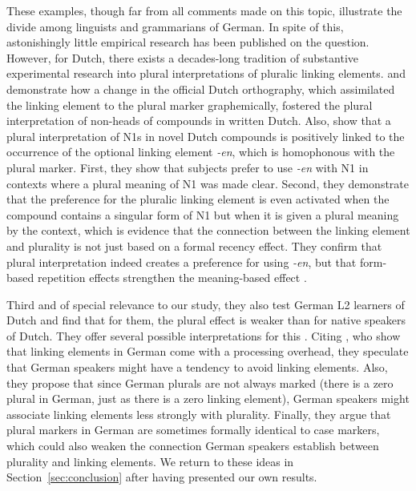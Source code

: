 These examples, though far from all comments made on this topic, illustrate the divide among linguists and grammarians of German.
In spite of this, astonishingly little empirical research has been published on the question.
However, for Dutch, there exists a decades-long tradition of substantive experimental research into plural interpretations of pluralic linking elements.
\citet{SchreuderEa1998} and \citet{BangaEa2012} demonstrate how a change in the official Dutch orthography, which assimilated the linking element to the plural marker graphemically, fostered the plural interpretation of non-heads of compounds in written Dutch.
Also, \citet{BangaEa2013a} show that a plural interpretation of N1s in novel Dutch compounds is positively linked to the occurrence of the optional linking element \mbox{\textit{-en}}, which is homophonous with the plural marker.
First, they show that subjects prefer to use \textit{-en} with N1 in contexts where a plural meaning of N1 was made clear.
Second, they demonstrate that the preference for the pluralic linking element is even activated when the compound contains a singular form of N1 but when it is given a plural meaning by the context, which is evidence that the connection between the linking element and plurality is not just based on a formal recency effect.
They confirm that plural interpretation indeed creates a preference for using \textit{-en}, but that form-based repetition effects strengthen the meaning-based effect \citep[45]{BangaEa2013a}.

Third and of special relevance to our study, they also test German L2 learners of Dutch and find that for them, the plural effect is weaker than for native speakers of Dutch.
They offer several possible interpretations for this \citep[45--47]{BangaEa2013a}.
Citing \citet{LibbenEa2002}, who show that linking elements in German come with a processing overhead, they speculate that German speakers might have a tendency to avoid linking elements.
Also, they propose that since German plurals are not always marked (there is a zero plural in German, just as there is a zero linking element), German speakers might associate linking elements less strongly with plurality.
Finally, they argue that plural markers in German are sometimes formally identical to case markers, which could also weaken the connection German speakers establish between plurality and linking elements.
We return to these ideas in Section~\ref{sec:conclusion} after having presented our own results.

